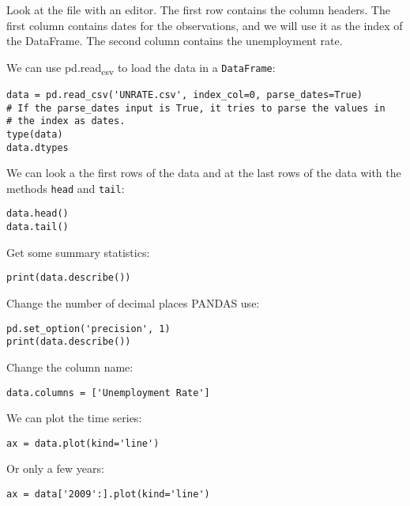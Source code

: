 \documentclass[12pt, a4paper]{article}
\begin{document}
Look at the file with an editor.
The first row contains the column headers.
The first column contains dates for the observations, and we will use it as the index of the DataFrame.
The second column contains the unemployment rate.

We can use pd.read\textsubscript{csv} to load the data in a \texttt{DataFrame}:
\lstset{language=jupyter-python,label= ,caption= ,captionpos=b,numbers=none}
\begin{lstlisting}
data = pd.read_csv('UNRATE.csv', index_col=0, parse_dates=True)
# If the parse_dates input is True, it tries to parse the values in
# the index as dates.
type(data)
data.dtypes
\end{lstlisting}

We can look a the first rows of the data and at the last rows of the data with the methods \texttt{head} and \texttt{tail}:
\lstset{language=jupyter-python,label= ,caption= ,captionpos=b,numbers=none}
\begin{lstlisting}
data.head()
data.tail()
\end{lstlisting}

Get some summary statistics:
\lstset{language=jupyter-python,label= ,caption= ,captionpos=b,numbers=none}
\begin{lstlisting}
print(data.describe())
\end{lstlisting}

Change the number of decimal places PANDAS use:
\lstset{language=jupyter-python,label= ,caption= ,captionpos=b,numbers=none}
\begin{lstlisting}
pd.set_option('precision', 1)
print(data.describe())
\end{lstlisting}

Change the column name:
\lstset{language=jupyter-python,label= ,caption= ,captionpos=b,numbers=none}
\begin{lstlisting}
data.columns = ['Unemployment Rate']
\end{lstlisting}

We can plot the time series:
\lstset{language=jupyter-python,label= ,caption= ,captionpos=b,numbers=none}
\begin{lstlisting}
ax = data.plot(kind='line')
\end{lstlisting}

Or only a few years:
\lstset{language=jupyter-python,label= ,caption= ,captionpos=b,numbers=none}
\begin{lstlisting}
ax = data['2009':].plot(kind='line')
\end{lstlisting}
\end{document}
